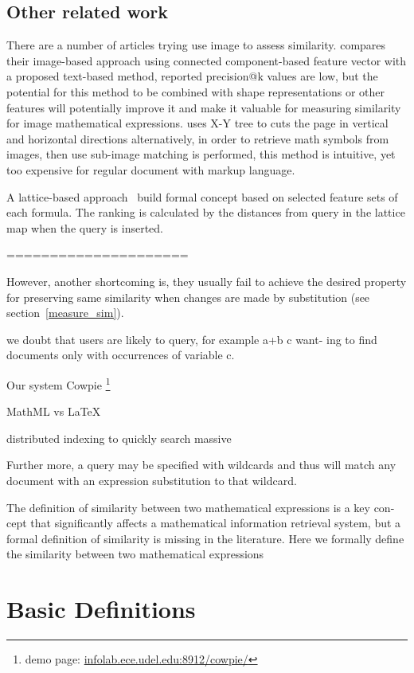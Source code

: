 \subsection{Other related work}
There are a number of articles trying use image to assess similarity. \cite{imageb11} compares their image-based approach using connected component-based feature vector with a proposed text-based method, reported precision@k values are low, but the potential for this method to be combined with shape representations or other features will potentially improve it and make it valuable for measuring similarity for image mathematical expressions. \cite{handwrite} uses \mbox{X-Y} tree to cuts the page in vertical and horizontal directions alternatively, in order to retrieve math symbols from images, then use sub-image matching is performed, this method is intuitive, yet too expensive for regular document with markup language.

A lattice-based approach~\cite{lattice} build formal concept based on selected feature sets of each formula. The ranking is calculated by the distances from query in the lattice map when the query is inserted. 


=====================
\pagebreak

However, another shortcoming is, they usually fail to achieve the desired property for preserving same similarity when changes are made by substitution (see section~\ref{measure_sim}).

we doubt that users are likely to query, for example a+b c want-
ing to find documents only with occurrences of variable c.

Our system Cowpie \footnote{demo page: \url{infolab.ece.udel.edu:8912/cowpie/}}

MathML vs LaTeX

distributed indexing to quickly search massive

Further more, a query may be specified with wildcards and thus will match any document with an expression substitution to that wildcard. 

The definition of similarity between two mathematical expressions is a key con-
cept that significantly affects a mathematical information retrieval system, but
a formal definition of similarity is missing in the literature. Here we formally
define the similarity between two mathematical expressions

\section{Basic Definitions}
